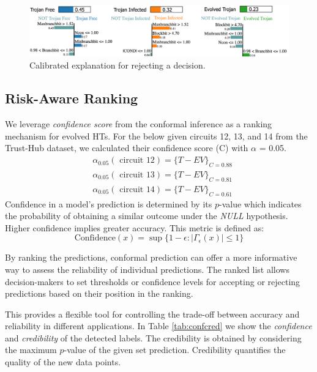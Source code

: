 \begin{figure}[h]
\centering
  \includegraphics[width=\linewidth]{figs/lime.png}
  \caption{Calibrated explanation for rejecting a decision.}
  \label{fig:lime}
\end{figure}

\subsection*{Risk-Aware Ranking}
\label{Sec:Risk}
We leverage \textit{confidence score} from the conformal inference as a ranking mechanism for evolved HTs. For the below given circuits 12, 13, and 14 from the Trust-Hub dataset, we calculated their confidence score (C) with $\alpha$ = 0.05. 
$$
\begin{aligned}
& \alpha_{0.05}(\text { circuit } 12)=\{T-E V\}_{C=0.88} \\
& \alpha_{0.05}(\text { circuit } 13)=\{T-E V\}_{C=0.81} \\
& \alpha_{0.05}(\text { circuit } 14)=\{T-E V\}_{C=0.61}
\end{aligned}
$$
Confidence in a model's prediction is determined by its $p$-value which indicates the probability of obtaining a similar outcome under the \textit{NULL} hypothesis. Higher confidence implies greater accuracy. This metric is defined as:
$$\text{Confidence} (x) = \sup \{1 - \epsilon : |\Gamma_\epsilon (x)| \leq 1\} $$

By ranking the predictions, conformal prediction can offer a more informative way to assess the reliability of individual predictions. The ranked list allows decision-makers to set thresholds or confidence levels for accepting or rejecting predictions based on their position in the ranking.

This provides a flexible tool for controlling the trade-off between accuracy and reliability in different applications. In Table \ref{tab:confcred} we show the \textit{confidence} and \textit{credibility} of the detected labels. The credibility is obtained by considering the maximum $p$-value of the given set prediction. Credibility quantifies the quality of the new data points. 

